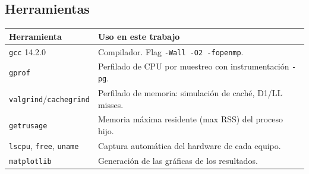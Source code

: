 \subsection{Herramientas}

\begin{center}
\begin{tabular}{|l|p{8.5cm}|}
\hline
\textbf{Herramienta} & \textbf{Uso en este trabajo} \\
\hline
\texttt{gcc} 14.2.0 & Compilador. Flag \texttt{-Wall -O2 -fopenmp}. \\
\texttt{gprof} & Perfilado de CPU por muestreo con instrumentación \texttt{-pg}. \\
\texttt{valgrind}/\texttt{cachegrind} & Perfilado de memoria: simulación de caché, D1/LL misses. \\
\texttt{getrusage} & Memoria máxima residente (max RSS) del proceso hijo. \\
\texttt{lscpu}, \texttt{free}, \texttt{uname} & Captura automática del hardware de cada equipo. \\
\texttt{matplotlib} & Generación de las gráficas de los resultados. \\
\hline
\end{tabular}
\end{center}
